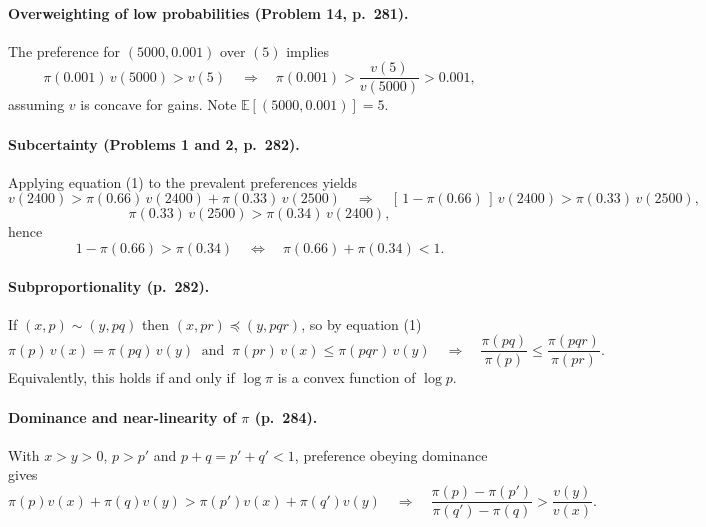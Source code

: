 \documentclass[11pt]{article}
\begin{document}
\paragraph{Overweighting of low probabilities (Problem 14, p.~281).}
The preference for $(5000,0.001)$ over $(5)$ implies
\begin{equation}\label{eq:overweight}
\pi(0.001)\,v(5000) > v(5)
\quad\Longrightarrow\quad
\pi(0.001) > \frac{v(5)}{v(5000)} > 0.001,
\end{equation}
assuming $v$ is concave for gains. Note $\mathbb{E}[(5000,0.001)] = 5$.

\paragraph{Subcertainty (Problems 1 and 2, p.~282).}
Applying equation (1) to the prevalent preferences yields
\begin{equation}\label{eq:subcert-1}
v(2400) > \pi(0.66)\,v(2400) + \pi(0.33)\,v(2500)
\quad\Longrightarrow\quad
[\,1-\pi(0.66)\,]\,v(2400) > \pi(0.33)\,v(2500),
\end{equation}
\begin{equation}\label{eq:subcert-2}
\pi(0.33)\,v(2500) > \pi(0.34)\,v(2400),
\end{equation}
hence
\begin{equation}\label{eq:subcert-3}
1-\pi(0.66) > \pi(0.34)
\quad\Longleftrightarrow\quad
\pi(0.66) + \pi(0.34) < 1 .
\end{equation}

\paragraph{Subproportionality (p.~282).}
If $(x,p) \sim (y,pq)$ then $(x,pr) \preceq (y,pqr)$, so by equation (1)
\begin{equation}\label{eq:subprop}
\pi(p)\,v(x) = \pi(pq)\,v(y)
\ \text{ and }\
\pi(pr)\,v(x) \le \pi(pqr)\,v(y)
\quad\Longrightarrow\quad
\frac{\pi(pq)}{\pi(p)} \le \frac{\pi(pqr)}{\pi(pr)} .
\end{equation}
Equivalently, this holds if and only if $\log \pi$ is a convex function of $\log p$.

\paragraph{Dominance and near-linearity of $\pi$ (p.~284).}
With $x>y>0$, $p>p'$ and $p+q=p'+q'<1$, preference obeying dominance gives
\begin{equation}\label{eq:dominance}
\pi(p)v(x) + \pi(q)v(y) > \pi(p')v(x) + \pi(q')v(y)
\quad\Longrightarrow\quad
\frac{\pi(p)-\pi(p')}{\pi(q')-\pi(q)} > \frac{v(y)}{v(x)} .
\end{equation}
\end{document}

